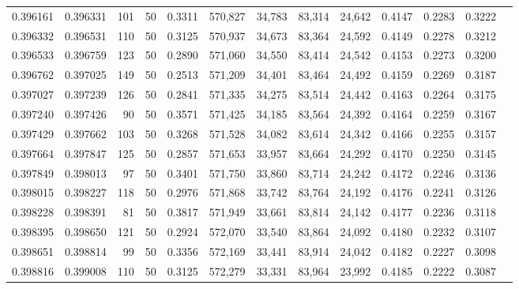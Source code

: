 \begin{tabular}{rrrrrrrrrrrrr}
0.396161 & 0.396331 &   101 &  50 &                                     0.3311 & 570,827 &  34,783 &  83,314 &  24,642 & 0.4147 & 0.2283 & 0.3222 \\
0.396332 & 0.396531 &   110 &  50 &                                     0.3125 & 570,937 &  34,673 &  83,364 &  24,592 & 0.4149 & 0.2278 & 0.3212 \\
0.396533 & 0.396759 &   123 &  50 &                                     0.2890 & 571,060 &  34,550 &  83,414 &  24,542 & 0.4153 & 0.2273 & 0.3200 \\
0.396762 & 0.397025 &   149 &  50 &                                     0.2513 & 571,209 &  34,401 &  83,464 &  24,492 & 0.4159 & 0.2269 & 0.3187 \\
0.397027 & 0.397239 &   126 &  50 &                                     0.2841 & 571,335 &  34,275 &  83,514 &  24,442 & 0.4163 & 0.2264 & 0.3175 \\
0.397240 & 0.397426 &    90 &  50 &                                     0.3571 & 571,425 &  34,185 &  83,564 &  24,392 & 0.4164 & 0.2259 & 0.3167 \\
0.397429 & 0.397662 &   103 &  50 &                                     0.3268 & 571,528 &  34,082 &  83,614 &  24,342 & 0.4166 & 0.2255 & 0.3157 \\
0.397664 & 0.397847 &   125 &  50 &                                     0.2857 & 571,653 &  33,957 &  83,664 &  24,292 & 0.4170 & 0.2250 & 0.3145 \\
0.397849 & 0.398013 &    97 &  50 &                                     0.3401 & 571,750 &  33,860 &  83,714 &  24,242 & 0.4172 & 0.2246 & 0.3136 \\
0.398015 & 0.398227 &   118 &  50 &                                     0.2976 & 571,868 &  33,742 &  83,764 &  24,192 & 0.4176 & 0.2241 & 0.3126 \\
0.398228 & 0.398391 &    81 &  50 &                                     0.3817 & 571,949 &  33,661 &  83,814 &  24,142 & 0.4177 & 0.2236 & 0.3118 \\
0.398395 & 0.398650 &   121 &  50 &                                     0.2924 & 572,070 &  33,540 &  83,864 &  24,092 & 0.4180 & 0.2232 & 0.3107 \\
0.398651 & 0.398814 &    99 &  50 &                                     0.3356 & 572,169 &  33,441 &  83,914 &  24,042 & 0.4182 & 0.2227 & 0.3098 \\
0.398816 & 0.399008 &   110 &  50 &                                     0.3125 & 572,279 &  33,331 &  83,964 &  23,992 & 0.4185 & 0.2222 & 0.3087 \\

\end{tabular}

